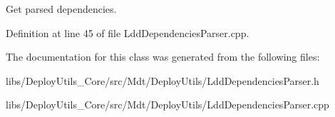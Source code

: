 Get parsed dependencies. 



Definition at line 45 of file Ldd\+Dependencies\+Parser.\+cpp.



The documentation for this class was generated from the following files\+:\begin{DoxyCompactItemize}
\item 
libs/\+Deploy\+Utils\+\_\+\+Core/src/\+Mdt/\+Deploy\+Utils/Ldd\+Dependencies\+Parser.\+h\item 
libs/\+Deploy\+Utils\+\_\+\+Core/src/\+Mdt/\+Deploy\+Utils/Ldd\+Dependencies\+Parser.\+cpp\end{DoxyCompactItemize}

